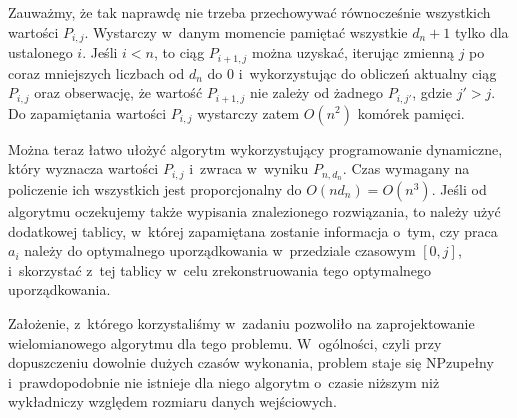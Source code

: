 Zauważmy, że tak naprawdę nie trzeba przechowywać równocześnie wszystkich wartości $P_{i,j}$.
Wystarczy w~danym momencie pamiętać wszystkie $d_n+1$ tylko dla ustalonego $i$.
Jeśli $i<n$, to ciąg $P_{i+1,j}$ można uzyskać, iterując zmienną $j$ po coraz mniejszych liczbach od $d_n$ do 0 i~wykorzystując do obliczeń aktualny ciąg $P_{i,j}$ oraz obserwację, że wartość $P_{i+1,j}$ nie zależy od żadnego $P_{i,j'}$, gdzie $j'>j$.
Do zapamiętania wartości $P_{i,j}$ wystarczy zatem $O(n^2)$ komórek pamięci.

Można teraz łatwo ułożyć algorytm wykorzystujący programowanie dynamiczne, który wyznacza wartości $P_{i,j}$ i~zwraca w~wyniku $P_{n,d_n}$\!.
Czas wymagany na policzenie ich wszystkich jest proporcjonalny do $O(nd_n)=O(n^3)$.
Jeśli od algorytmu oczekujemy także wypisania znalezionego rozwiązania, to należy użyć dodatkowej tablicy, w~której zapamiętana zostanie informacja o~tym, czy praca $a_i$ należy do optymalnego uporządkowania w~przedziale czasowym $[0,j]$, i~skorzystać z~tej tablicy w~celu zrekonstruowania tego optymalnego uporządkowania.

Założenie, z~którego korzystaliśmy w~zadaniu pozwoliło na zaprojektowanie wielomianowego algorytmu dla tego problemu.
W~ogólności, czyli przy dopuszczeniu dowolnie dużych czasów wykonania, problem staje się NP\nbhyphen zupełny i~prawdopodobnie nie istnieje dla niego algorytm o~czasie niższym niż wykładniczy względem rozmiaru danych wejściowych.
